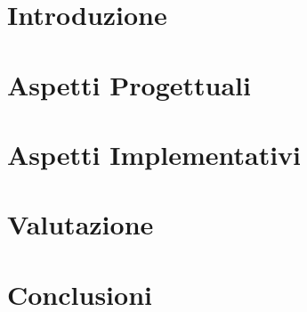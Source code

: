 \documentclass[a4paper,10pt]{article}
\title{}
\author{}
\begin{document}
\maketitle

\begin{abstract}

\end{abstract}

\section{Introduzione}


\section{Aspetti Progettuali}


\section{Aspetti Implementativi}


\section{Valutazione}


\section{Conclusioni}

\end{document}

